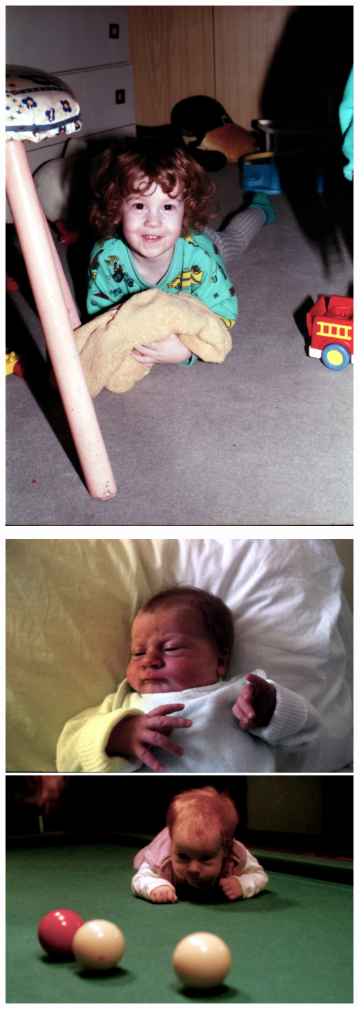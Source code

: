 \documentclass[aspectratio=169]{beamer}
\begin{document}
\begin{frame}[fragile]
\begin{minipage}{.14\textwidth}
        \includegraphics[width=1.0\textwidth]{images/0200.jpg}
    \end{minipage}%
    \begin{minipage}{.65\textwidth}
        \centering
        \includegraphics[width=.33\textwidth]{images/0101.jpg}%
        \includegraphics[width=.33\textwidth]{images/0102.jpg}%

\end{minipage}
\end{frame}
\end{document}
